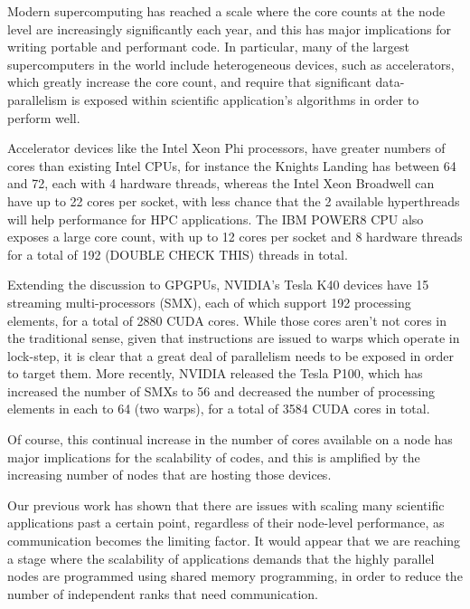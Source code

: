 \documentclass[runningheads,a4paper]{llncs}
\begin{document}
Modern supercomputing has reached a scale where the core counts at the node level are increasingly significantly each year, and this has major implications for writing portable and performant code. In particular, many of the largest supercomputers in the world include heterogeneous devices, such as accelerators, which greatly increase the core count, and require that significant data-parallelism is exposed within scientific application's algorithms in order to perform well.

Accelerator devices like the Intel Xeon Phi processors, have greater numbers of cores than existing Intel CPUs, for instance the Knights Landing has between 64 and 72, each with 4 hardware threads, whereas the Intel Xeon Broadwell can have up to 22 cores per socket, with less chance that the 2 available hyperthreads will help performance for HPC applications. The IBM POWER8 CPU also exposes a large core count, with up to 12 cores per socket and 8 hardware threads for a total of 192 (DOUBLE CHECK THIS) threads in total.

Extending the discussion to GPGPUs, NVIDIA's Tesla K40 devices have 15 streaming multi-processors (SMX), each of which support 192 processing elements, for a total of 2880 CUDA cores. While those cores aren't not cores in the traditional sense, given that instructions are issued to warps which operate in lock-step, it is clear that a great deal of parallelism needs to be exposed in order to target them. More recently, NVIDIA released the Tesla P100, which has increased the number of SMXs to 56 and decreased the number of processing elements in each to 64 (two warps), for a total of 3584 CUDA cores in total.

Of course, this continual increase in the number of cores available on a node has major implications for the scalability of codes, and this is amplified by the increasing number of nodes that are hosting those devices. 

Our previous work has shown that there are issues with scaling many scientific applications past a certain point, regardless of their node-level performance, as communication becomes the limiting factor. It would appear that we are reaching a stage where the scalability of applications demands that the highly parallel nodes are programmed using shared memory programming, in order to reduce the number of independent ranks that need communication. 
\end{document}
